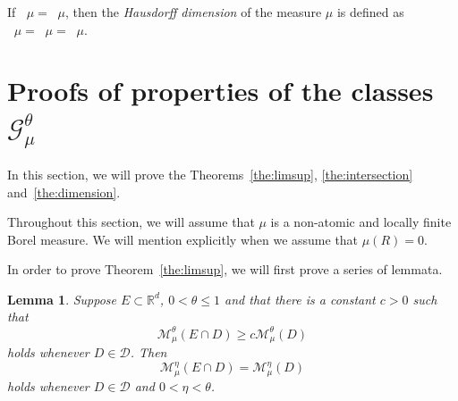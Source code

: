\documentclass[10pt]{amsart}
\newtheorem{lemm}[theo]{Lemma}\newtheorem{prop}[theo]{Proposition}\newtheorem{coro}[theo]{Corollary}\newtheorem{conj}[theo]{Conjecture}
\theoremstyle{definition}\newtheorem{defi}[theo]{Definition}\newtheorem{rema}[theo]{Remark}\newtheorem{exam}[theo]{Example}\newtheorem{exem}[theo]{Example}\newtheorem{nota}[theo]{Notation}
\DeclareMathOperator{\dimh}{dim_H}
\DeclareMathOperator{\ldimh}{\underline{dim}_H}
\DeclareMathOperator{\udimh}{\overline{dim}_H}
\begin{document}
If $\ldimh \mu = \udimh \mu$, then the {\em Hausdorff dimension} of the measure $\mu$ is defined as $\dimh \mu = \ldimh \mu = \udimh \mu$.


\section{Proofs of properties of the classes \texorpdfstring{$\mathscr{G}_\mu^\theta$}{}} \label{sec:propertiesproofs}

In this section, we will prove the Theorems~\ref{the:limsup}, \ref{the:intersection} and~\ref{the:dimension}.

Throughout this section, we will assume that $\mu$ is a non-atomic and locally finite Borel measure. We will mention explicitly when we assume that $\mu (R) = 0$.

In order to prove Theorem~\ref{the:limsup}, we will first prove a series of lemmata.

\begin{lemm}\label{lem:removec}
Suppose $E \subset \mathbb{R}^d$, $0 < \theta \leq 1$ and that there is a constant $c > 0$ such that
\[
\mathscr{M}_\mu^\theta (E \cap D) \geq c \mathscr{M}_\mu^\theta (D)
\]
holds whenever $D \in \mathscr{D}$. Then
\[
\mathscr{M}_\mu^\eta (E \cap D) = \mathscr{M}_\mu^\eta (D)
\]
holds whenever $D \in \mathscr{D}$ and $0 < \eta < \theta$.
\end{lemm}
\end{document}

